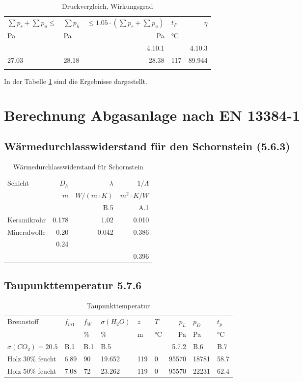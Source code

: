 \documentclass[a4paper,10pt,twoside]{article}
\begin{document}
\begin{table}[htbp]
\caption{\label{tab:orgaee0935}
Druckvergleich, Wirkungsgrad}
\centering
\begin{tabular}{llrlr}
\(\sum p_r+ \sum p_u \le\) & \(\sum p_h\) & \(\le 1.05\cdot (\sum p_r+ \sum p_u)\) & \(t_F\) & \(\eta\)\\
Pa & Pa & Pa & °C & \\
 &  & 4.10.1 &  & 4.10.3\\
\hline
27.03 & 28.18 & 28.38 & 117 & 89.944\\
 &  &  &  & \\
\end{tabular}
\end{table}

In der Tabelle \ref{tab:orgaee0935} sind die Ergebnisse dargestellt.

\section{Berechnung Abgasanlage nach EN 13384-1 \cite{EN13384}}
\label{sec:org2d528ce}
\label{org0cbeb1d}
\subsection{Wärmedurchlasswiderstand für den Schornstein (5.6.3)}
\label{sec:org09a5b82}
\begin{table}[htbp]
\caption{Wärmedurchlasswiderstand für Schornstein}
\centering
\begin{tabular}{lrrr}
Schicht & \(D_h\) & \(\lambda\) & \(1/\Lambda\)\\
 & \(m\) & \(W/(m\cdot K)\) & \(m^2\cdot K/W\)\\
 &  & B.5 & A.1\\
\hline
Keramikrohr & 0.178 & 1.02 & 0.010\\
Mineralwolle & 0.20 & 0.042 & 0.386\\
 & 0.24 &  & \\
 &  &  & 0.396\\
\end{tabular}
\end{table}

\subsection{Taupunkttemperatur 5.7.6}
\label{sec:orga2b9931}
\begin{table}[htbp]
\caption{Taupunkttemperatur}
\centering
\begin{tabular}{llllllrll}
Brennstoff & \(f_{m1}\) & \(f_W\) & \(\sigma(H_2O)\) & \(z\) & \(T\) & \(p_L\) & \(p_D\) & \(t_p\)\\
 &  & \% & \% & m & °C & Pa & Pa & °C\\
\(\sigma(CO_2)=20.5\) & B.1 & B.1 & B.5 &  &  & 5.7.2 & B.6 & B.7\\
\hline
Holz 30\% feucht & 6.89 & 90 & 19.652 & 119 & 0 & 95570 & 18781 & 58.7\\
Holz 50\% feucht & 7.08 & 72 & 23.262 & 119 & 0 & 95570 & 22231 & 62.4\\
\end{tabular}
\end{table}
\end{document}
